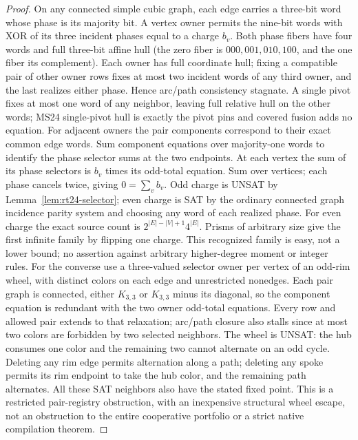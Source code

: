 \documentclass[11pt]{article}
\begin{document}
\begin{proof}
On any connected simple cubic graph, each edge carries a three-bit word whose phase is its majority bit. A vertex owner permits the nine-bit words with XOR of its three incident phases equal to a charge $b_v$. Both phase fibers have four words and full three-bit affine hull (the zero fiber is $000,001,010,100$, and the one fiber its complement). Each owner has full coordinate hull; fixing a compatible pair of other owner rows fixes at most two incident words of any third owner, and the last realizes either phase. Hence arc/path consistency stagnate. A single pivot fixes at most one word of any neighbor, leaving full relative hull on the other words; MS24 single-pivot hull is exactly the pivot pins and covered fusion adds no equation.
For adjacent owners the pair components correspond to their exact common edge words. Sum component equations over majority-one words to identify the phase selector sums at the two endpoints. At each vertex the sum of its phase selectors is $b_v$ times its odd-total equation. Sum over vertices; each phase cancels twice, giving $0=\sum_v b_v$. Odd charge is UNSAT by Lemma~\ref{lem:rt24-selector}; even charge is SAT by the ordinary connected graph incidence parity system and choosing any word of each realized phase. For even charge the exact source count is $2^{|E|-|V|+1}4^{|E|}$. Prisms of arbitrary size give the first infinite family by flipping one charge. This recognized family is easy, not a lower bound; no assertion against arbitrary higher-degree moment or integer rules.
For the converse use a three-valued selector owner per vertex of an odd-rim wheel, with distinct colors on each edge and unrestricted nonedges. Each pair graph is connected, either $K_{3,3}$ or $K_{3,3}$ minus its diagonal, so the component equation is redundant with the two owner odd-total equations. Every row and allowed pair extends to that relaxation; arc/path closure also stalls since at most two colors are forbidden by two selected neighbors. The wheel is UNSAT: the hub consumes one color and the remaining two cannot alternate on an odd cycle. Deleting any rim edge permits alternation along a path; deleting any spoke permits its rim endpoint to take the hub color, and the remaining path alternates. All these SAT neighbors also have the stated fixed point. This is a restricted pair-registry obstruction, with an inexpensive structural wheel escape, not an obstruction to the entire cooperative portfolio or a strict native compilation theorem.
\end{proof}
\end{document}
